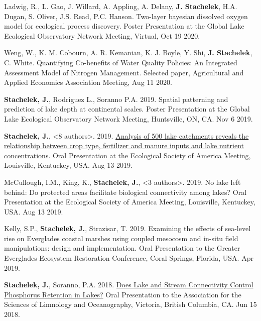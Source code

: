 \documentclass[11pt]{article}
\makeatletter
\newlength{\bibhang}
\newlength{\bibsep}
 {\@listi \global\bibsep\itemsep \global\advance\bibsep by\parsep}
\newenvironment{bibenum*}
  {\renewcommand\labelenumi{[\theenumi]}%
   \etaremune[
     topsep=0pt,
     itemsep=\bibsep,
     parsep=0pt,partopsep=0pt,
     itemindent=-\bibhang,
     leftmargin={\bibhang+\widthof{[999]}}]}
  {\endetaremune}
\makeatother
\begin{document}
\begin{bibenum*}

\item Ladwig, R., L. Gao, J. Willard, A. Appling, A. Delany, \textbf{J. Stachelek}, H.A. Dugan, S. Oliver, J.S. Read, P.C. Hanson. Two-layer bayesian dissolved oxygen model for ecological process discovery. Poster Presentation at the Global Lake Ecological Observatory Network Meeting, Virtual, Oct 19 2020.

\item Weng, W., K. M. Cobourn, A. R. Kemanian, K. J. Boyle, Y. Shi, \textbf{J. Stachelek}, C. White. Quantifying Co-benefits of Water Quality Policies:  An Integrated Assessment Model of Nitrogen Management. Selected paper, Agricultural and Applied Economics Association Meeting, Aug 11 2020.

\item \textbf{Stachelek, J.}, Rodriguez L., Soranno P.A. 2019. Spatial patterning and prediction of lake depth at continental scales. Poster Presentation at the Global Lake Ecological Observatory Network Meeting, Huntsville, ON, CA. Nov 6 2019.

\item \textbf{Stachelek, J.}, <8 authors>. 2019. \href{https://doi.org/10.6084/m9.figshare.12486164.v2}{Analysis of 500 lake catchments reveals the relationship between crop type, fertilizer and manure inputs and lake nutrient concentrations}. Oral Presentation at the Ecological Society of America Meeting, Louisville, Kentuckey, USA. Aug 13 2019.

\item McCullough, I.M., King, K., \textbf{Stachelek, J.}, <3 authors>. 2019. No lake left behind: Do protected areas facilitate biological connectivity among lakes? Oral Presentation at the Ecological Society of America Meeting, Louisville, Kentuckey, USA. Aug 13 2019.

\item Kelly, S.P., \textbf{Stachelek, J.}, Strazisar, T. 2019. Examining the effects of sea-level rise on Everglades coastal marshes using coupled mesocosm and in-situ field manipulations: design and implementation. Oral Presentation to the Greater Everglades Ecosystem Restoration Conference, Coral Springs, Florida, USA. Apr 2019.

  \item \textbf{Stachelek, J.}, Soranno, P.A. 2018. \href{https://doi.org/10.6084/m9.figshare.5903875.v2}{Does Lake and Stream Connectivity Control Phosphorus Retention in Lakes?} Oral Presentation to the Association for the Sciences of Limnology and Oceanography, Victoria, British Columbia, CA. Jun 15 2018.


\end{bibenum*}
\end{document}
